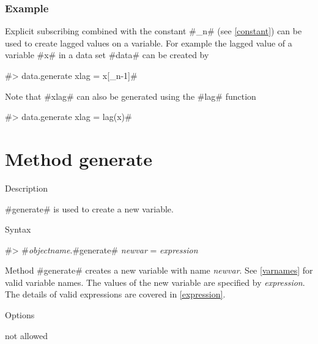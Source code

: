 \subsubsection*{Example}

Explicit subscribing combined with the constant #_n# (see
\autoref{constant}) can be used to create lagged values
on a variable. For example the lagged value of a variable #x# in a data set #data# can be created by

#> data.generate xlag = x[_n-1]#

Note that #xlag# can also be generated using the #lag# function

#> data.generate xlag = lag(x)#


\clearpage

\section{Method generate}
\label{generate} 

\begin{stanza}{Description}

{#generate# is used to create a new variable.}
\end{stanza}


\begin{stanza}{Syntax}

{#> #{\em objectname}.#generate# {\em newvar} = {\em expression}

Method #generate# creates a new variable with name {\em newvar}.
See \autoref{varnames} for valid variable names. The values of the
new variable are specified by {\em expression}. The details of
valid expressions are covered in \autoref{expression}.}
\end{stanza}


\begin{stanza}{Options}

{not allowed}
\end{stanza}


